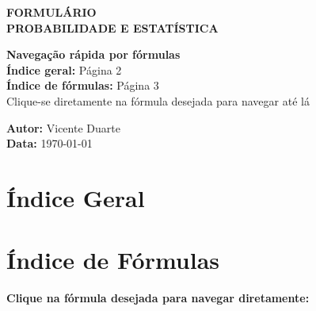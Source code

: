 \documentclass[a4paper,12pt]{article}
\begin{document}
\begin{titlepage}
    \centering
    \vspace*{2cm}
    {\Huge\bfseries\color{sectioncolor} FORMULÁRIO}\\[0.5em]
    {\huge\bfseries\color{sectioncolor} PROBABILIDADE E ESTATÍSTICA}\\[3em]
    
    \begin{tcolorbox}[colback=formulabox,colframe=sectioncolor,width=0.8\textwidth]
        \centering
        {\large\textbf{Navegação rápida por fórmulas}}\\[0.5em]
        {\normalsize \textbf{Índice geral:} Página 2}\\
        {\normalsize \textbf{Índice de fórmulas:} Página 3}\\[0.3em]
        {\small Clique-se diretamente na fórmula desejada para navegar até lá}
    \end{tcolorbox}
    
    \vfill
    {\large\textbf{Autor:} Vicente Duarte}\\[1em]
    {\large\textbf{Data:} \today}
    \vspace{2cm}
\end{titlepage}

\newpage
{}
{\color{sectioncolor}\section*{Índice Geral}}
\tableofcontents

\newpage
{\color{sectioncolor}\section*{Índice de Fórmulas}}
\begin{tcolorbox}[colback=formulabox,colframe=sectioncolor]
\textbf{Clique na fórmula desejada para navegar diretamente:}
\end{tcolorbox}
\end{document}
